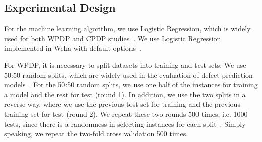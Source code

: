 




\subsection{Experimental Design}
\label{sec:expdesign}

For the machine learning algorithm, we use Logistic Regression, which is widely
used for both WPDP and CPDP
studies~\cite{Meneely2008,Nam13,Shihab11,Zimmermann09}.
We use Logistic Regression implemented in Weka with default
options~\cite{Weka}.

For WPDP, it is necessary to split datasets into training and test
sets. We use 50:50 random splits, which are widely used in the evaluation of
defect prediction models~\cite{Klas2010,Nam13,Pinzger2008}. For the 50:50 random
splits, we use one half of the instances for training a model and the rest for
test (round 1). In addition, we use the two splits in a reverse way, where we
use the previous test set for training and the previous training set for test
(round 2). We repeat these two rounds 500 times, i.e. 1000 tests, since there
is a randomness in selecting instances for each split~\cite{Arcuri11}. Simply
speaking, we repeat the two-fold cross validation 500 times.

